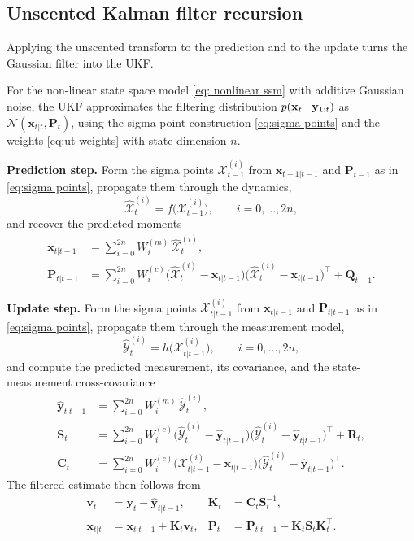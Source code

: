 \subsection{Unscented Kalman filter recursion}
Applying the unscented transform to the prediction and to the update turns the Gaussian filter into the UKF.

\begin{theorem}\label{thm:ukf}
For the non-linear state space model \eqref{eq: nonlinear ssm} with additive Gaussian noise, the UKF approximates the filtering distribution $p(\mathbf{x}_t \mid \mathbf{y}_{1:t})$ as $\mathcal{N}(\mathbf{x}_{t|t}, \mathbf{P}_t)$, using the sigma-point construction \eqref{eq:sigma points} and the weights \eqref{eq:ut weights} with state dimension $n$.

\noindent\textbf{Prediction step.}
Form the sigma points $\mathcal{X}^{(i)}_{t-1}$ from $\mathbf{x}_{t-1|t-1}$ and $\mathbf{P}_{t-1}$ as in \eqref{eq:sigma points}, propagate them through the dynamics,
\[
    \hat{\mathcal{X}}^{(i)}_{t} = f\bigl(\mathcal{X}^{(i)}_{t-1}\bigr), \qquad i = 0, \dots, 2n,
\]
and recover the predicted moments
\begin{align*}
    \mathbf{x}_{t|t-1} &= \sum_{i=0}^{2n} W_i^{(m)}\, \hat{\mathcal{X}}^{(i)}_{t}, \\
    \mathbf{P}_{t|t-1} &= \sum_{i=0}^{2n} W_i^{(c)} \bigl(\hat{\mathcal{X}}^{(i)}_{t} - \mathbf{x}_{t|t-1}\bigr)\bigl(\hat{\mathcal{X}}^{(i)}_{t} - \mathbf{x}_{t|t-1}\bigr)^{\top} + \mathbf{Q}_{t-1}.
\end{align*}

\noindent\textbf{Update step.}
Form the sigma points $\mathcal{X}^{(i)}_{t|t-1}$ from $\mathbf{x}_{t|t-1}$ and $\mathbf{P}_{t|t-1}$ as in \eqref{eq:sigma points}, propagate them through the measurement model,
\[
    \hat{\mathcal{Y}}^{(i)}_{t} = h\bigl(\mathcal{X}^{(i)}_{t|t-1}\bigr), \qquad i = 0, \dots, 2n,
\]
and compute the predicted measurement, its covariance, and the state-measurement cross-covariance
\begin{align*}
    \hat{\mathbf{y}}_{t|t-1} &= \sum_{i=0}^{2n} W_i^{(m)}\, \hat{\mathcal{Y}}^{(i)}_{t}, \\
    \mathbf{S}_{t} &= \sum_{i=0}^{2n} W_i^{(c)} \bigl(\hat{\mathcal{Y}}^{(i)}_{t} - \hat{\mathbf{y}}_{t|t-1}\bigr)\bigl(\hat{\mathcal{Y}}^{(i)}_{t} - \hat{\mathbf{y}}_{t|t-1}\bigr)^{\top} + \mathbf{R}_{t}, \\
    \mathbf{C}_{t} &= \sum_{i=0}^{2n} W_i^{(c)} \bigl(\mathcal{X}^{(i)}_{t|t-1} - \mathbf{x}_{t|t-1}\bigr)\bigl(\hat{\mathcal{Y}}^{(i)}_{t} - \hat{\mathbf{y}}_{t|t-1}\bigr)^{\top}.
\end{align*}
The filtered estimate then follows from
\begin{align*}
    \mathbf{v}_{t} &= \mathbf{y}_{t} - \hat{\mathbf{y}}_{t|t-1}, &
    \mathbf{K}_{t} &= \mathbf{C}_{t}\mathbf{S}_{t}^{-1}, \\
    \mathbf{x}_{t|t} &= \mathbf{x}_{t|t-1} + \mathbf{K}_{t}\mathbf{v}_{t}, &
    \mathbf{P}_{t} &= \mathbf{P}_{t|t-1} - \mathbf{K}_{t}\mathbf{S}_{t}\mathbf{K}_{t}^{\top}.
\end{align*}
\end{theorem}


